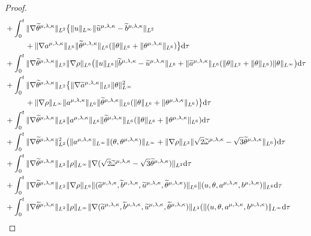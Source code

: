 \documentclass[reqno,11pt]{amsart}
\theoremstyle{plain}
\numberwithin{equation}{section}
\begin{document}
\begin{proof}
\begin{align}
&+\int_0^t\|\nabla\widetilde{\theta}^{\mu,\lambda,\kappa}\|_{L^2}\big\{ \|u\|_{L^\infty}\|\widetilde{u}^{\mu,\lambda,\kappa}-\widetilde{b}^{\mu,\lambda,\kappa}\|_{L^2}\nonumber\\
 &\qquad \ \
+\|\nabla{a}^{\mu,\lambda,\kappa}\|_{L^6} \|\widetilde{\theta}^{\mu,\lambda,\kappa}\|_{L^6}(\|\theta\|_{L^6}+\|\theta^{\mu,\lambda,\kappa}
\|_{L^6})\big\}{\rm d}\tau\nonumber\\
&+\int_0^t  \|\nabla\widetilde{\theta}^{\mu,\lambda,\kappa}\|_{L^2} \|\nabla\rho\|_{L^6}\big(\|u\|_{L^6}\|\widetilde{b}^{\mu,\lambda,\kappa}-\widetilde{u}^{\mu,\lambda,\kappa}\|_{L^6}+\|\widetilde{a}^{\mu,\lambda,\kappa}\|_{L^6}(\|\theta\|_{L^2}+\|\theta\|_{L^6})\|\theta\|_{L^\infty}  \big){\rm d}\tau\nonumber\\
&+\int_0^t  \|\nabla\widetilde{\theta}^{\mu,\lambda,\kappa}\|_{L^2}\big\{\|\nabla \widetilde{a}^{\mu,\lambda,\kappa}\|_{L^2}\|\theta\|_{L^\infty}^2\nonumber\\
&\qquad \ \ 
+\|\nabla\rho\|_{L^\infty} \|a^{\mu,\lambda,\kappa}\|_{L^6}\|\widetilde{\theta}^{\mu,\lambda,\kappa}\|_{L^6}(\|\theta\|_{L^6}+\|\theta^{\mu,\lambda,\kappa}\|_{L^6})\big\}{\rm d}\tau\nonumber\\
&+\int_0^t \|\nabla\widetilde{\theta}^{\mu,\lambda,\kappa}\|_{L^2} \|a^{\mu,\lambda,\kappa}
\|_{L^6}\|\widetilde{\theta}^{\mu,\lambda,\kappa}\|_{L^6}(\|\theta\|_{L^6}
+\|\theta^{\mu,\lambda,\kappa}\|_{L^6}){\rm d}\tau\nonumber\\   
  &+\int_0^t\|\nabla\widetilde{\theta}^{\mu,\lambda,\kappa}\|_{L^2}^2
  \big(\|a^{\mu,\lambda,\kappa}\|_{L^\infty}\|(\theta,
  \theta^{\mu,\lambda,\kappa})\|_{L^\infty}+\|\nabla\rho\|_{L^3}\|\sqrt{2}
  \widetilde{\omega}^{\mu,\lambda,\kappa}
-\sqrt{3}\widetilde{\theta}^{\mu,\lambda,\kappa}\|_{L^6}\big) {\rm d}\tau\nonumber\\
&+\int_0^t\|\nabla\widetilde{\theta}^{\mu,\lambda,\kappa}\|_{L^2} \|\rho\|_{L^\infty}\|\nabla(\sqrt{2}\widetilde{\omega}^{\mu,\lambda,\kappa}-\sqrt{3}\widetilde{\theta}^{\mu,\lambda,\kappa})\|_{L^2}   {\rm d}\tau\nonumber\\
&+\int_0^t \|\nabla\widetilde{\theta}^{\mu,\lambda,\kappa}\|_{L^2}\|\nabla\rho\|_{L^6}\|(\widetilde{a}^{\mu,\lambda,\kappa},\widetilde{b}^{\mu,\lambda,\kappa},\widetilde{u}^{\mu,\lambda,\kappa},\widetilde{\theta}^{\mu,\lambda,\kappa})\|_{L^6} \|(u,\theta,a^{\mu,\lambda,\kappa},b^{\mu,\lambda,\kappa})\|_{L^6} {\rm d}\tau\nonumber\\
&+\int_0^t \|\nabla\widetilde{\theta}^{\mu,\lambda,\kappa}\|_{L^2}\|\rho\|_{L^\infty}\|\nabla(\widetilde{a}^{\mu,\lambda,\kappa},\widetilde{b}^{\mu,\lambda,\kappa},\widetilde{u}^{\mu,\lambda,\kappa},\widetilde{\theta}^{\mu,\lambda,\kappa})\|_{L^2}(\|(u,\theta,a^{\mu,\lambda,\kappa},b^{\mu,\lambda,\kappa})\|_{L^\infty}{\rm d}\tau\nonumber\\

\end{align}
\end{proof}
\end{document}
